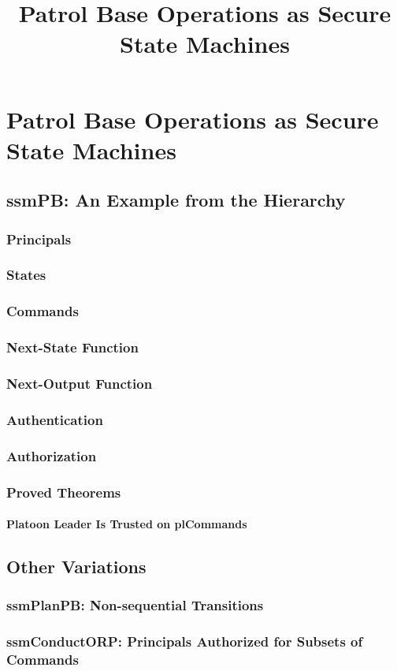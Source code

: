 \documentclass[../../main/main.tex]{subfiles}
\begin{document}
\title{Patrol Base Operations as Secure State Machines}


\chapter{Patrol Base Operations as Secure State Machines} \label{chp:pbssm}

\section{ssmPB: An Example from the Hierarchy}\label{sec:ssmpb}

\subsection{Principals}
\subsection{States}
\subsection{Commands}
\subsection{Next-State Function}
\subsection{Next-Output Function}
\subsection{Authentication}
\subsection{Authorization}
\subsection{Proved Theorems}
\subsubsection{Platoon Leader Is Trusted on plCommands}


\section{Other Variations}\label{sec:other}

\subsection{ssmPlanPB: Non-sequential Transitions}
\subsection{ssmConductORP: Principals Authorized for Subsets of Commands}
\end{document}
